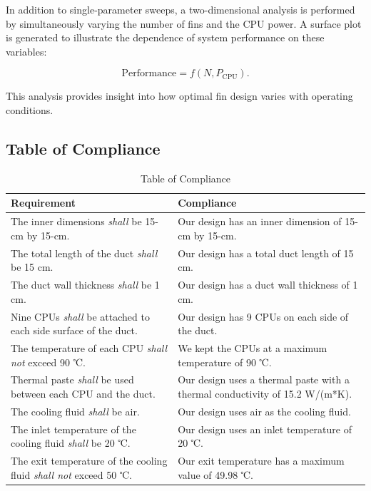\documentclass[12pt, titlepage]{article}
\begin{document}
In addition to single-parameter sweeps, a two-dimensional analysis is performed by simultaneously varying the number of fins and the CPU power. A surface plot is generated to illustrate the dependence of system performance on these variables:

\begin{equation}
\text{Performance} = f(N, P_{\text{CPU}}).
\end{equation}

This analysis provides insight into how optimal fin design varies with operating conditions.

\subsection{Table of Compliance}

\begin{table}[H]
\centering
\caption{Table of Compliance}
\begin{tabular}{|p{8cm}|p{8cm}|}
\hline
\quad \quad \quad \quad \quad \quad \quad Requirement & \quad \quad \quad \quad \quad \quad \quad  Compliance \\ \hline
The inner dimensions \textit{shall} be 15-cm by 15-cm. & Our design has an inner dimension of 15-cm by 15-cm.  \\ \hline
The total length of the duct \textit{shall} be 15 cm. & Our design has a total duct length of 15 cm.  \\ \hline
The duct wall thickness \textit{shall} be 1 cm. & Our design has a duct wall thickness of 1 cm.  \\ \hline
Nine CPUs \textit{shall} be attached to each side surface of the duct. & Our design has 9 CPUs on each side of the duct.  \\ \hline
The temperature of each CPU \textit{shall not} exceed 90 ℃. & We kept the CPUs at a maximum temperature of 90 ℃.  \\ \hline
Thermal paste \textit{shall} be used between each CPU and the duct. & Our design uses a thermal paste with a thermal conductivity of 15.2 W/(m*K).  \\ \hline
The cooling fluid \textit{shall} be air. & Our design uses air as the cooling fluid.  \\ \hline
The inlet temperature of the cooling fluid \textit{shall} be 20 ℃. & Our design uses an inlet temperature of 20 ℃.  \\ \hline
The exit temperature of the cooling fluid \textit{shall not} exceed 50 ℃. & Our exit temperature has a maximum value of 49.98 ℃.  \\ \hline

\end{tabular}
\end{table}
\end{document}
